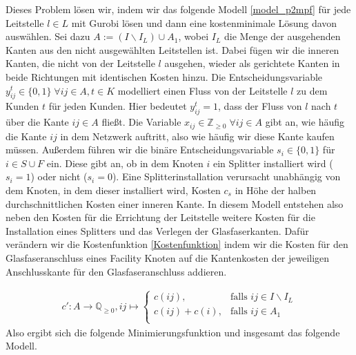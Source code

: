 \documentclass[11pt,a4paper]{article}
\newcommand{\Z}{\mathbb{Z}}
\newcommand{\Q}{\mathbb{Q}}
\theoremstyle{my_th_style1}
\begin{document}
Dieses Problem lösen wir, indem wir das folgende Modell \ref{model_p2mpf} für jede Leitstelle $l \in L $ mit Gurobi \cite{gurobi} lösen und dann eine kostenminimale L\"osung davon ausw\"ahlen.
Sei dazu $A:= (I \backslash I_L) \cup A_1$, wobei $I_L$ die Menge der ausgehenden Kanten aus den nicht ausgewählten Leitstellen ist.
Dabei f\"ugen wir die inneren Kanten, die nicht von der Leitstelle \(l\) ausgehen, wieder als gerichtete Kanten in beide Richtungen mit identischen Kosten hinzu.
Die Entscheidungsvariable $y_{ij}^t \in \{0,1\}\; \forall ij \in A, t \in K$ modelliert einen Fluss von der Leitstelle $l$ zu dem Kunden $t$ für jeden Kunden.
Hier bedeutet $y_{ij}^t=1$, dass der Fluss von $l$ nach $t$ über die Kante $ij \in A$ fließt.
Die Variable $x_{ij} \in \Z_{\geq 0} \; \forall ij \in A $ gibt an, wie häufig die Kante \(ij\) in dem Netzwerk auftritt, also wie häufig wir diese Kante kaufen müssen.
Außerdem f\"uhren wir die binäre Entscheidungsvariable $s_i \in \{0,1\}$ für $i \in S \cup F$ ein.
Diese gibt an, ob in dem Knoten $i$ ein Splitter installiert wird ($s_i=1$) oder nicht ($s_i=0$).
Eine Splitterinstallation verursacht unabh\"angig von dem Knoten, in dem dieser installiert wird, Kosten \(c_s\) in H\"ohe der halben durchschnittlichen Kosten einer inneren Kante.
In diesem Modell entstehen also neben den Kosten f\"ur die Errichtung der Leitstelle weitere Kosten f\"ur die Installation eines Splitters und das Verlegen der Glasfaserkanten.
Daf\"ur ver\"andern wir die Kostenfunktion \eqref{Kostenfunktion} indem wir die Kosten für den Glasfaseranschluss eines Facility Knoten auf die Kantenkosten der jeweiligen Anschlusskante für den Glasfaseranschluss addieren.

\begin{align}
\label{KostenfunktionP2MP}
c': A \rightarrow \Q_{ \geq 0}, ij  \mapsto \left\{\begin{array}{cl} 
c(ij), & \text{falls } ij \in I\backslash I_L\\ 
c(ij)+c(i), & \text{falls } ij \in A_1\\ 
\end{array}
\right.
\end{align}
Also ergibt sich die folgende Minimierungsfunktion und insgesamt das folgende Modell.
\end{document}
